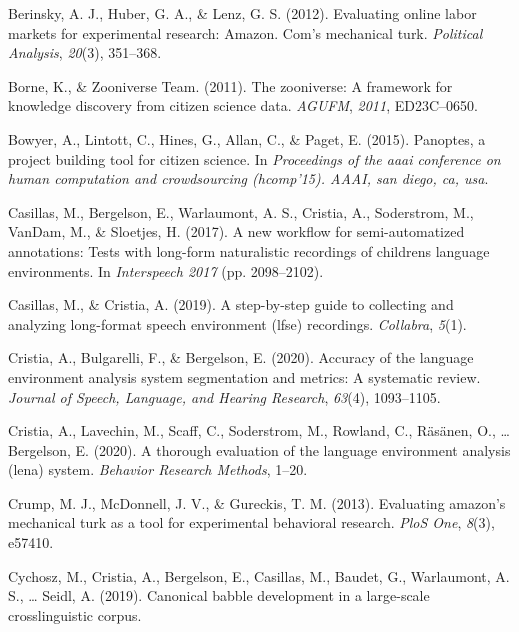 \documentclass[english,,man]{apa6}
\begin{document}
\leavevmode\hypertarget{ref-berinsky2012evaluating}{}%
Berinsky, A. J., Huber, G. A., \& Lenz, G. S. (2012). Evaluating online labor markets for experimental research: Amazon. Com's mechanical turk. \emph{Political Analysis}, \emph{20}(3), 351--368.

\leavevmode\hypertarget{ref-borne2011zooniverse}{}%
Borne, K., \& Zooniverse Team. (2011). The zooniverse: A framework for knowledge discovery from citizen science data. \emph{AGUFM}, \emph{2011}, ED23C--0650.

\leavevmode\hypertarget{ref-bowyer2015panoptes}{}%
Bowyer, A., Lintott, C., Hines, G., Allan, C., \& Paget, E. (2015). Panoptes, a project building tool for citizen science. In \emph{Proceedings of the aaai conference on human computation and crowdsourcing (hcomp'15). AAAI, san diego, ca, usa}.

\leavevmode\hypertarget{ref-casillas2017new}{}%
Casillas, M., Bergelson, E., Warlaumont, A. S., Cristia, A., Soderstrom, M., VanDam, M., \& Sloetjes, H. (2017). A new workflow for semi-automatized annotations: Tests with long-form naturalistic recordings of childrens language environments. In \emph{Interspeech 2017} (pp. 2098--2102).

\leavevmode\hypertarget{ref-casillas2019step}{}%
Casillas, M., \& Cristia, A. (2019). A step-by-step guide to collecting and analyzing long-format speech environment (lfse) recordings. \emph{Collabra}, \emph{5}(1).

\leavevmode\hypertarget{ref-cristia2020accuracy}{}%
Cristia, A., Bulgarelli, F., \& Bergelson, E. (2020). Accuracy of the language environment analysis system segmentation and metrics: A systematic review. \emph{Journal of Speech, Language, and Hearing Research}, \emph{63}(4), 1093--1105.

\leavevmode\hypertarget{ref-cristia2020thorough}{}%
Cristia, A., Lavechin, M., Scaff, C., Soderstrom, M., Rowland, C., Räsänen, O., \ldots{} Bergelson, E. (2020). A thorough evaluation of the language environment analysis (lena) system. \emph{Behavior Research Methods}, 1--20.

\leavevmode\hypertarget{ref-crump2013evaluating}{}%
Crump, M. J., McDonnell, J. V., \& Gureckis, T. M. (2013). Evaluating amazon's mechanical turk as a tool for experimental behavioral research. \emph{PloS One}, \emph{8}(3), e57410.

\leavevmode\hypertarget{ref-cychosz2019canonical}{}%
Cychosz, M., Cristia, A., Bergelson, E., Casillas, M., Baudet, G., Warlaumont, A. S., \ldots{} Seidl, A. (2019). Canonical babble development in a large-scale crosslinguistic corpus.
\end{document}
